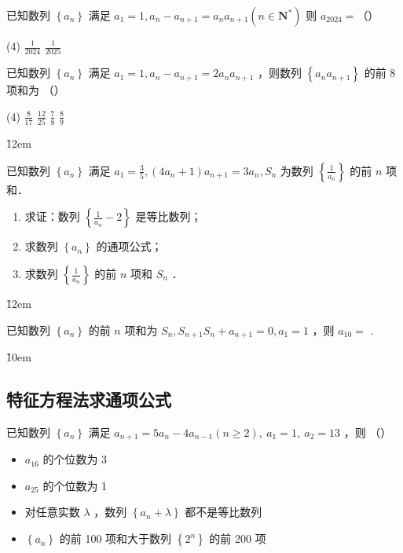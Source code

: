 \begin{example}
    已知数列 $\left\{a_n\right\}$ 满足 $a_1=1, a_n-a_{n+1}=a_n a_{n+1}\left(n \in \mathbf{N}^*\right)$ 则 $a_{2024}=$（\quad）
    \begin{tasks}(4)
        \task $\frac{1}{2024}$
        \task $\frac{1}{2025}$
    \end{tasks}
\end{example}

\vspace{12em}

\begin{example}
    已知数列 $\left\{a_n\right\}$ 满足 $a_1=1, a_n-a_{n+1}=2 a_n a_{n+1}$ ，则数列 $\left\{a_n a_{n+1}\right\}$ 的前 8 项和为 （\qquad）
    \begin{tasks}(4)
        \task $\frac{8}{17}$
        \task $\frac{12}{25}$
        \task $\frac{7}{8}$
        \task $\frac{8}{9}$
    \end{tasks}
\end{example}

\v{12em}

\begin{example}
    已知数列 $\left\{a_n\right\}$ 满足 $a_1=\frac{3}{5},\left(4 a_n+1\right) a_{n+1}=3 a_n, S_n$ 为数列 $\left\{\frac{1}{a_n}\right\}$ 的前 $n$ 项和．
    \begin{enumerate}
        \item 求证：数列 $\left\{\frac{1}{a_n}-2\right\}$ 是等比数列；
        \item 求数列 $\left\{a_n\right\}$ 的通项公式；
        \item 求数列 $\left\{\frac{1}{a_n}\right\}$ 的前 $n$ 项和 $S_n$ ．
    \end{enumerate}
\end{example}

\v{12em}

\begin{example}
    已知数列 $\left\{a_n\right\}$ 的前 $n$ 项和为 $S_n, S_{n+1} S_n+a_{n+1}=0, a_1=1$ ，则 $a_{10}=$ \underline{\qquad}.
\end{example}

\v{10em}

\subsection{特征方程法求通项公式}

\begin{example}
    已知数列 $\left\{a_n\right\}$ 满足 $a_{n+1}=5 a_n-4 a_{n-1}(n \geq 2), ~ a_1=1, ~ a_2=13$ ，则 （\qquad）
    \begin{itemize}
        \item $a_{16}$ 的个位数为 3
        \item $a_{25}$ 的个位数为 1
        \item 对任意实数 $\lambda$ ，数列 $\left\{a_n+\lambda\right\}$ 都不是等比数列
        \item $\left\{a_n\right\}$ 的前 100 项和大于数列 $\left\{2^n\right\}$ 的前 200 项
    \end{itemize}
\end{example}

